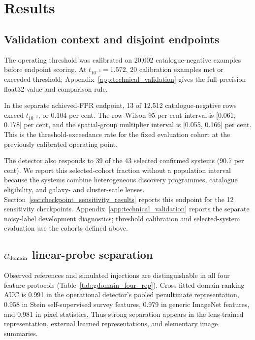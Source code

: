 \section{Results}
\label{sec:results}

\subsection{Validation context and disjoint endpoints}
\label{sec:current_detector_results}

The operating threshold was calibrated on 20,002 catalogue-negative examples
before endpoint scoring. At \(t_{10^{-3}}=1.572\), 20 calibration examples
met or exceeded threshold; Appendix~\ref{app:technical_validation} gives the
full-precision float32 value and comparison rule.

In the separate achieved-FPR endpoint, 13 of 12,512 catalogue-negative rows
exceed \(t_{10^{-3}}\), or 0.104 per cent. The row-Wilson 95 per cent
interval is [0.061, 0.178] per cent, and the spatial-group multiplier
interval is [0.055, 0.166] per cent. This is the threshold-exceedance rate for
the fixed evaluation cohort at the previously calibrated operating point.

The detector also responds to 39 of the 43 selected confirmed systems
(90.7 per cent). We report this selected-cohort fraction without a population
interval because the systems combine heterogeneous discovery programmes,
catalogue eligibility, and galaxy- and cluster-scale lenses.
Section~\ref{sec:checkpoint_sensitivity_results} reports this endpoint for the
12 sensitivity checkpoints. Appendix~\ref{app:technical_validation} reports
the separate noisy-label development diagnostics; threshold calibration and
selected-system evaluation use the cohorts defined above.

\subsection{\(G_{\rm domain}\) linear-probe separation}
\label{sec:domain_probe_results}

Observed references and simulated injections are distinguishable in all four
feature protocols (Table~\ref{tab:gdomain_four_rep}). Cross-fitted
domain-ranking AUC is 0.991 in the
operational detector's pooled penultimate representation, 0.958 in Stein
self-supervised survey features, 0.979 in generic ImageNet features, and
0.981 in pixel statistics. Thus strong separation appears in the lens-trained
representation, external learned representations, and elementary image
summaries.

